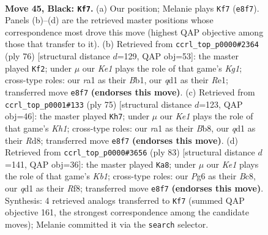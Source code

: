 \documentclass[11pt]{article}
\begin{document}
\clearpage

\begin{figure}[p]\centering
\begin{subfigure}{0.46\textwidth}\centering
\resizebox{\linewidth}{!}{%
\newchessgame
\chessboard[
  setfen={4k2r/p2r3p/bq1b2pP/1p1p1pP1/1n1P1P2/1P2P2K/4N3/R2Q1BNR b - - 37 45},
  showmover=false,
  pgfstyle=straightmove, color=movearrow, markmove={e8-f7}
]}
\caption{}
\end{subfigure}\hfill
\begin{subfigure}{0.46\textwidth}\centering
\resizebox{\linewidth}{!}{%
\newchessgame
\chessboard[
  setfen={q5k1/4n1p1/r3ppn1/1p1b3p/2pP3P/2P2P1Q/1P1BN1P1/1B2R1K1 w - - 1 39},
  showmover=false,
  pgfstyle=straightmove, color=movearrow, markmove={g1-f2}
]}
\caption{}
\end{subfigure}
\\[4pt]
\begin{subfigure}{0.46\textwidth}\centering
\resizebox{\linewidth}{!}{%
\newchessgame
\chessboard[
  setfen={1b1r3k/pb1q1p2/1p2pp1r/8/PP1PpN1P/4P1P1/3R1PN1/2RQ2K1 b - - 2 38},
  showmover=false,
  pgfstyle=straightmove, color=movearrow, markmove={h8-h7}
]}
\caption{}
\end{subfigure}\hfill
\begin{subfigure}{0.46\textwidth}\centering
\resizebox{\linewidth}{!}{%
\newchessgame
\chessboard[
  setfen={1kb2r1b/p2qpp2/3p4/P1pPP3/npP1QP1N/1N4R1/1P6/K1B5 b - - 24 42},
  showmover=false,
  pgfstyle=straightmove, color=movearrow, markmove={b8-a8}
]}
\caption{}
\end{subfigure}
\caption{\textbf{Move 45, Black: \texttt{Kf7}.} (a) Our position; Melanie plays \texttt{Kf7} (\texttt{e8f7}). Panels (b)--(d) are the retrieved master positions whose correspondence most drove this move (highest QAP objective among those that transfer to it). (b) Retrieved from \texttt{ccrl\_top\_p0000\#2364} (ply 76) [structural distance $d$=129, QAP obj=53]: the master played \texttt{Kf2}; under $\mu$ our \emph{Ke1} plays the role of that game's \emph{Kg1}; cross-type roles: our \emph{r}a1 as their \emph{B}b1, our \emph{q}d1 as their \emph{R}e1; transferred move \texttt{e8f7} \textbf{(endorses this move)}. (c) Retrieved from \texttt{ccrl\_top\_p0001\#133} (ply 75) [structural distance $d$=123, QAP obj=46]: the master played \texttt{Kh7}; under $\mu$ our \emph{Ke1} plays the role of that game's \emph{Kh1}; cross-type roles: our \emph{r}a1 as their \emph{B}b8, our \emph{q}d1 as their \emph{R}d8; transferred move \texttt{e8f7} \textbf{(endorses this move)}. (d) Retrieved from \texttt{ccrl\_top\_p0000\#3656} (ply 83) [structural distance $d$=141, QAP obj=36]: the master played \texttt{Ka8}; under $\mu$ our \emph{Ke1} plays the role of that game's \emph{Kb1}; cross-type roles: our \emph{P}g6 as their \emph{B}c8, our \emph{q}d1 as their \emph{R}f8; transferred move \texttt{e8f7} \textbf{(endorses this move)}. Synthesis: 4 retrieved analogs transferred to \texttt{Kf7} (summed QAP objective 161, the strongest correspondence among the candidate moves); Melanie committed it via the \texttt{search} selector.}
\label{fig:thought-m89}
\end{figure}
\end{document}
